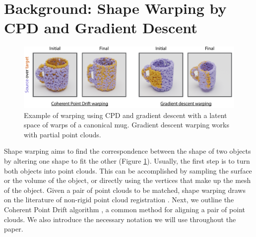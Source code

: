 \documentclass{article}
\newcommand{\rob}[1]{\textcolor{green}{[\textbf{rob:} #1]}}
\begin{document}
\section{Background: Shape Warping by CPD and Gradient Descent}
\label{sec:background}

\begin{figure}
    \centering
    \includegraphics[width=\textwidth]{figures/warping.pdf}
    \caption{Example of warping using CPD and gradient descent with a latent space of warps of a canonical mug. Gradient descent warping works with partial point clouds.}
    \label{fig:warping}
\end{figure}

Shape warping aims to find the correspondence between the shape of two objects by altering one shape to fit the other (Figure \ref{fig:warping}). Usually, the first step is to turn both objects into point clouds. This can be accomplished by sampling the surface or the volume of the object, or directly using the vertices that make up the mesh of the object. Given a pair of point clouds to be matched, shape warping draws on the literature of non-rigid point cloud registration \cite{huang21comprehensive}. Next, we outline the Coherent Point Drift algorithm \cite{manuelli20keypoints}, a common method for aligning a pair of point clouds. We also introduce the necessary notation we will use throughout the paper.
\end{document}
